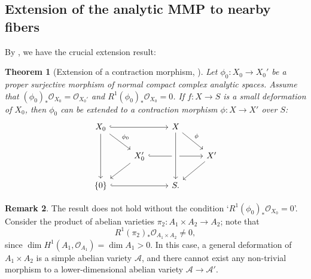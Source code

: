 \documentclass[12pt]{amsart}
\numberwithin{equation}{section}
\newtheorem{theorem} {Theorem} [section]
\theoremstyle{definition}
\theoremstyle{plain}
\newtheorem*{thm A*}{Theorem A}
\newtheorem*{thm B*}{Theorem B}
\newtheorem*{thm C*}{Theorem C}
\newtheorem*{thm D*}{Theorem D}
\theoremstyle{definition}
\newtheorem{remark}  [theorem]     {Remark}
\renewcommand{\1}{\mathds{1}}
\renewcommand{\>}{\rightarrow}
\begin{document}
\subsection{Extension of the analytic MMP to nearby fibers} By \cite{KM92}, we have the crucial extension result: 
\begin{theorem}[{Extension of a contraction morphism, \cite[Proposition (11.4)]{KM92}}]\label{ExtendCont}
Let $\phi_0: X_0 \to X_{0}'$ be a proper surjective morphism of normal compact complex analytic spaces. Assume that $(\phi_0)_* \mathcal{O}_{X_0} = \mathcal{O}_{X_0'}$ and $R^1(\phi_0)_* \mathcal{O}_{X_0} = 0$. If $f:X\to S$ is a small deformation of $X_0$, then $\phi_0$ can be extended to a contraction morphism $\phi: X\to X'$ over $S$:
\[\begin{tikzcd}
	{X_0} && X \\
	& {X'_0} & {} & {X'} \\
	{\{0\}} && {S.}
	\arrow[hook, from=1-1, to=1-3]
	\arrow["{\phi_0}", from=1-1, to=2-2]
	\arrow[from=1-1, to=3-1]
	\arrow["\phi", from=1-3, to=2-4]
	\arrow[from=1-3, to=3-3]
	\arrow[hook, no head, from=2-2, to=2-3]
	\arrow[from=2-2, to=3-1]
	\arrow[from=2-3, to=2-4]
	\arrow[from=2-4, to=3-3]
	\arrow[hook, from=3-1, to=3-3]
\end{tikzcd}\]
\end{theorem}
\begin{remark}
The result does not hold without the condition  `$R^1 (\phi_0)_* \mathcal{O}_{X_0} = 0$'. Consider the product of abelian varieties $ \pi_2 : A_1 \times A_2 \to A_2 $; note that
\[
R^1 (\pi_2)_* \mathcal{O}_{A_1 \times A_2} \neq 0,
\]
since $\dim H^1(A_1,\mathcal{O}_{A_1}) = \dim A_1  >0$. In this case, a general deformation of $ A_1 \times A_2 $ is a simple abelian variety $ \mathcal{A} $, and there cannot exist any non-trivial morphism to a lower-dimensional abelian variety $ \mathcal{A}\to \mathcal{A}' $.
\end{remark}
\end{document}
